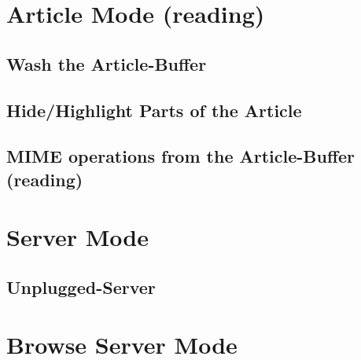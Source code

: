 \section*{Article Mode (reading)}
\ArticleModeGeneral
    \subsection*{Wash the Article-Buffer}
    \WashArticle
    \subsection*{Hide/Highlight Parts of the Article}
    \HideHighlightArticle
    \subsection*{MIME operations from the Article-Buffer (reading)}
    \MIMEArticleMode
%
%
\section*{Server Mode}
\ServerMode
    \subsection*{Unplugged-Server}
    \ServerUnplugged
%
%
\section*{Browse Server Mode}
\BrowseServer

\vspace*{\fill}
\Copyright




